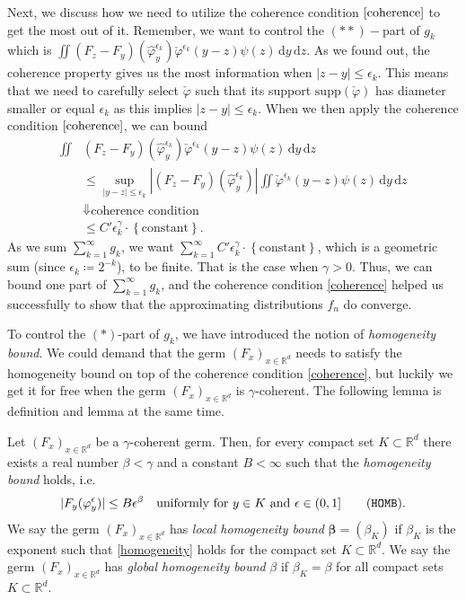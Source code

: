 Next, we discuss how we need to utilize the coherence condition $\eqref{coherence}$ to get the most out of it. Remember, we want to control the $(**)-$part of $g_k$ which is $ \iint (F_z - F_y)(\hat \varphi^{\epsilon_k}_y) \check \varphi^{\epsilon_k}(y-z) \psi(z) \, \mathrm{d}y\, \mathrm{d}z$. As we found out, the coherence property gives us the most information when $|z - y| \leq \epsilon_k$. This means that we need to carefully select $\check \varphi$ such that its support $\mathrm{supp}(\check \varphi)$ has diameter smaller or equal $\epsilon_k$ as this implies $|z-y| \leq \epsilon_k$. When we then apply the coherence condition $\eqref{coherence}$, we can bound 
\begin{align*}
    \iint &(F_z - F_y)(\hat \varphi^{\epsilon_k}_y) \check \varphi^{\epsilon_k}(y-z) \psi(z) \, \mathrm{d}y\, \mathrm{d}z 
    \\ & \leq \sup_{|y-z|\leq \epsilon_k}|(F_z -F_y)(\hat \varphi^{\epsilon_k}_y)| \iint  \check \varphi^{\epsilon_k}(y-z) \psi(z) \, \mathrm{d}y\, \mathrm{d}z    \\
    &\Downarrow \text{coherence condition}
    \\ &\leq C' \epsilon_k^{\gamma} \cdot \left\{ \text{constant} \right\}.
\end{align*}
As we sum $\sum^\infty_{k=1} g_k$, we want $\sum^\infty_{k=1} C' \epsilon_k^{\gamma} \cdot \left\{ \text{constant} \right\}$, which is a geometric sum (since $\epsilon_k \coloneqq 2^{-k}$), to be finite. That is the case when $\gamma > 0$. Thus, we can bound one part of $\sum^\infty_{k=1} g_k$, and the coherence condition \eqref{coherence} helped us successfully to show that the approximating distributions $f_n$ do converge.

To control the $(*)$-part of $g_k$, we have introduced the notion of \emph{homogeneity bound}. We could demand that the germ $(F_x)_{x \in \mathbb{R}^d}$ needs to satisfy the homogeneity bound on top of the coherence condition \eqref{coherence}, but luckily we get it for free when the germ $(F_x)_{x \in \mathbb{R}^d}$ is $\gamma$-coherent. The following lemma is definition and lemma at the same time.

\begin{lemma}
   Let $(F_x)_{x \in \mathbb{R}^d}$ be a $\gamma$-coherent germ. Then, for every compact set $K \subset \mathbb{R}^d$ there exists a real number $\beta < \gamma$ and a constant $B < \infty$ such that the \emph{homogeneity bound} holds, i.e. 
   \begin{gather*}\label{homogeneity}
                |F_y(\varphi^\epsilon_y)| \leq B\epsilon^\beta \quad
                \text{uniformly for $y \in K$ and $\epsilon \in (0,1]$} \tag{\texttt{HOMB}}.
   \end{gather*}
   We say the germ $(F_x)_{x \in \mathbb{R}^d}$ has \emph{local homogeneity bound} $\bm \beta = (\beta_K)$ if $\beta_K$ is the exponent such that \eqref{homogeneity} holds for the compact set $K \subset \mathbb{R}^d$. We say the germ $(F_x)_{x \in \mathbb{R}^d}$ has \emph{global homogeneity bound} $\beta$ if $\beta_K = \beta$ for all compact sets $K \subset \mathbb{R}^d$.
\end{lemma}

